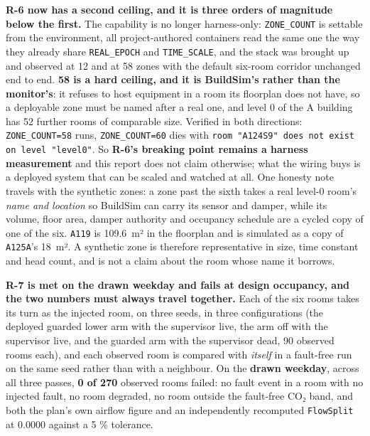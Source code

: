 \textbf{R-6 now has a second ceiling, and it is three orders of magnitude below the first.} The
capability is no longer harness-only: \texttt{ZONE\_COUNT} is settable from the environment, all
\factAuthoredServices{} project-authored containers read the same one the way they already share \texttt{REAL\_EPOCH}
and \texttt{TIME\_SCALE}, and the stack was brought up and observed at 12 and at 58 zones with the
default six-room corridor unchanged end to end. \textbf{58 is a hard ceiling, and it is BuildSim's
rather than the monitor's}: it refuses to host equipment in a room its floorplan does not have, so a
deployable zone must be named after a real one, and level 0 of the A building has 52 further rooms
of comparable size. Verified in both directions: \texttt{ZONE\_COUNT=58} runs, \texttt{ZONE\_COUNT=60}
dies with \texttt{room "A124S9" does not exist on level "level0"}. So \textbf{R-6's breaking point
remains a harness measurement} and this report does not claim otherwise; what the wiring buys is a
deployed system that can be scaled and watched at all. One honesty note travels with the synthetic
zones: a zone past the sixth takes a real level-0 room's \emph{name and location} so BuildSim can
carry its sensor and damper, while its volume, floor area, damper authority and occupancy schedule
are a cycled copy of one of the six. \texttt{A119} is 109.6~m² in the floorplan and is simulated as
a copy of \texttt{A125A}'s 18~m². A synthetic zone is therefore representative in size, time constant
and head count, and is not a claim about the room whose name it borrows.

\textbf{R-7 is met on the drawn weekday and fails at design occupancy, and the two numbers must
always travel together.} Each of the six rooms takes its turn as the injected room, on three seeds,
in three configurations (the deployed guarded lower arm with the supervisor live, the arm off with
the supervisor live, and the guarded arm with the supervisor dead, 90 observed rooms each), and each
observed room is compared with \emph{itself} in a fault-free run on the same seed rather than with a
neighbour. On the \textbf{drawn weekday}, across all three passes, \textbf{0 of 270} observed rooms
failed: no fault event in a room with no injected fault, no room degraded, no room outside the
fault-free CO₂ band, and both the plan's own airflow figure and an independently recomputed
\texttt{FlowSplit} at 0.0000 against a 5 \% tolerance.

